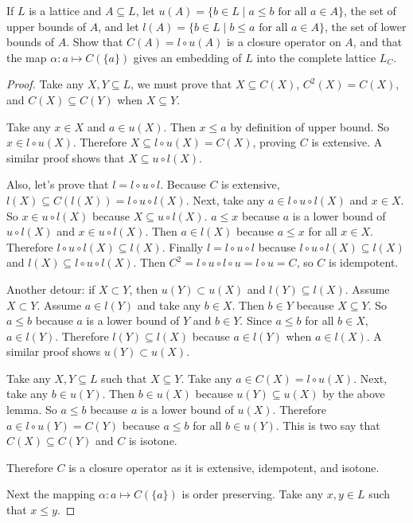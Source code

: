\begin{theorem*}
If $L$ is a lattice and $A \subseteq L$,
let $u(A) = \{ b \in L \mid a \leq b \text{ for all } a \in A \}$, the set of upper bounds of $A$,
and let $l(A) = \{ b \in L \mid b \leq a \text{ for all } a \in A \}$, the set of lower bounds of $A$.
Show that $C(A) = l \circ u (A)$ is a closure operator on $A$, and that the map $\alpha : a \mapsto C(\{a\})$ gives an embedding of $L$ into the complete lattice $L_C$.
\end{theorem*}

\begin{proof}
Take any $X, Y \subseteq L$, we must prove that $X \subseteq C(X)$, $C^2(X) = C(X)$, and $C(X) \subseteq C(Y)$ when $X\subseteq Y$.

Take any $x \in X$ and $a \in u(X)$.
Then $x \leq a$ by definition of upper bound.
So $x \in l\circ u(X)$.
Therefore $X \subseteq  l\circ u(X) = C(X)$, proving $C$ is extensive.
A similar proof shows that $X \subseteq u\circ l(X)$.

Also, let's prove that $l = l \circ u \circ l$.
Because $C$ is extensive, $l(X) \subseteq C(l(X)) = l \circ u  \circ l(X)$.
Next, take any $a \in l \circ u \circ l (X)$ and $x \in X$.
So $x \in u \circ l(X)$ because $X\subseteq u\circ l(X)$.
$a \leq x$ because $a$ is a lower bound of $u \circ l (X)$ and $x \in u \circ l (X)$.
Then $a \in l(X)$ because $a \leq x$ for all $x \in X$. 
Therefore $l \circ u  \circ l(X) \subseteq l(X)$.
Finally $l = l \circ u \circ l$ because $l \circ u  \circ l(X) \subseteq l(X)$ and $l(X) \subseteq l \circ u  \circ l(X)$.
Then $C^2 = l \circ u \circ l \circ u = l \circ u  = C$, so $C$ is idempotent.

Another detour: if $X \subset Y$, then $u(Y) \subset u(X)$ and $l(Y) \subseteq l(X)$.
Assume $X \subset Y$.
Assume $a \in l(Y)$ and take any $b \in X$.
Then $b \in Y$ because $X \subseteq Y$.
So $a \leq b$ because $a$ is a lower bound of $Y$ and $b \in Y$.
Since $a \leq b$ for all $b\in X$, $a \in l(Y)$.
Therefore $l(Y) \subseteq l(X)$ because $a\in l(Y)$ when $a\in l(X)$.
A similar proof shows $u(Y) \subset u(X)$.

Take any $X, Y \subseteq L$ such that $X \subseteq Y$.
Take any $a \in C(X) = l \circ u (X)$.
Next, take any $b \in u(Y)$.
Then $b \in u(X)$ because $u(Y) \subseteq u(X)$ by the above lemma.
So $a \leq b$ because $a$ is a lower bound of $u(X)$.
Therefore $a \in l\circ u(Y) = C(Y)$ because $a \leq b$ for all $b\in u(Y)$.
This is two say that $C(X) \subseteq C(Y)$ and $C$ is isotone.

Therefore $C$ is a closure operator as it is extensive, idempotent, and isotone.

Next the mapping $\alpha:a \mapsto C(\{a\})$ is order preserving.
Take any $x, y \in L$ such that $x \leq y$.




\end{proof}

